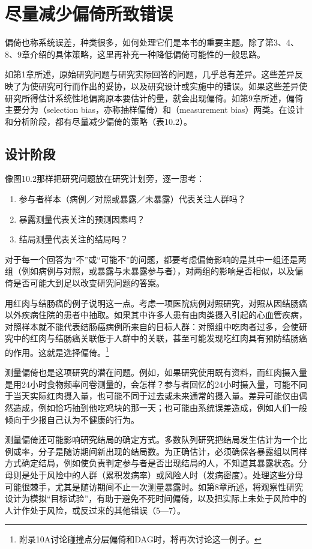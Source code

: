 \section{尽量减少偏倚所致错误}
偏倚也称系统误差，种类很多，如何处理它们是本书的重要主题。除了第3、4、8、9章介绍的具体策略，这里再补充一种降低偏倚可能性的一般思路。

如第1章所述，原始研究问题与研究实际回答的问题，几乎总有差异。这些差异反映了为使研究可行而作出的妥协，以及研究设计或实施中的错误。如果这些差异使研究所得估计系统性地偏离原本要估计的量，就会出现偏倚。如第9章所述，偏倚主要分为（selection bias，亦称抽样偏倚）和（measurement bias）两类。在设计和分析阶段，都有尽量减少偏倚的策略（表10.2）。

\subsection{设计阶段}
像图10.2那样把研究问题放在研究计划旁，逐一思考：
\begin{enumerate}
\item 参与者样本（病例／对照或暴露／未暴露）代表关注人群吗？
\item 暴露测量代表关注的预测因素吗？
\item 结局测量代表关注的结局吗？
\end{enumerate}
对于每一个回答为“不”或“可能不”的问题，都要考虑偏倚影响的是其中一组还是两组（例如病例与对照，或暴露与未暴露参与者），对两组的影响是否相似，以及偏倚是否可能大到足以改变研究问题的答案。

用红肉与结肠癌的例子说明这一点。考虑一项医院病例对照研究，对照从因结肠癌以外疾病住院的患者中抽取。如果其中许多人患有由肉类摄入引起的心血管疾病，对照样本就不能代表结肠癌病例所来自的目标人群：对照组中吃肉者过多，会使研究中的红肉与结肠癌关联低于人群中的关联，甚至可能发现吃红肉具有预防结肠癌的作用。这就是选择偏倚。\footnote{附录10A讨论碰撞点分层偏倚和DAG时，将再次讨论这一例子。}

测量偏倚也是这项研究的潜在问题。例如，如果研究使用既有资料，而红肉摄入量是用24小时食物频率问卷测量的，会怎样？参与者回忆的24小时摄入量，可能不同于当天实际红肉摄入量，也可能不同于过去或未来通常的摄入量。差异可能仅由偶然造成，例如恰巧抽到他吃鸡块的那一天；也可能由系统误差造成，例如人们一般倾向于少报自己认为不健康的行为。

测量偏倚还可能影响研究结局的确定方式。多数队列研究把结局发生估计为一个比例或率，分子是随访期间新出现的结局数。为正确估计，必须确保各暴露组以同样方式确定结局，例如使负责判定参与者是否出现结局的人，不知道其暴露状态。分母则是处于风险中的人群（累积发病率）或风险人时（发病密度）。处理这些分母可能很棘手，尤其是随访期间不止一次测量暴露时。如第8章所述，将观察性研究设计为模拟“目标试验”，有助于避免不死时间偏倚，以及把实际上未处于风险中的人计作处于风险，或反过来的其他错误（5—7）。

